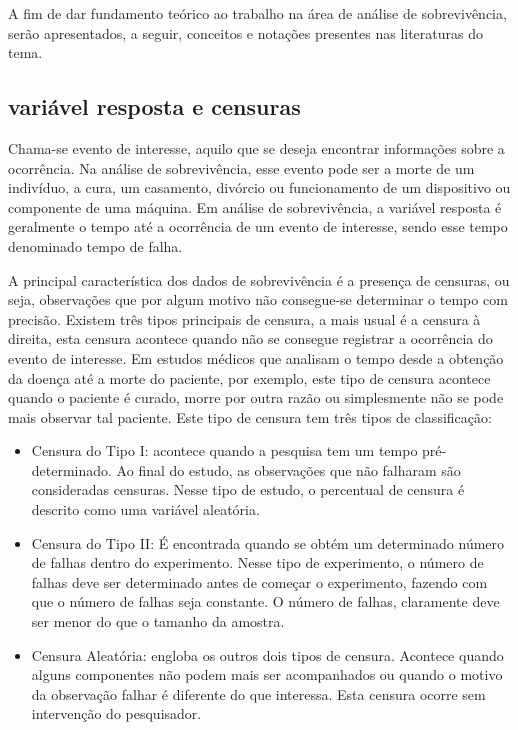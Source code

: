 \documentclass[a4paper,12pt]{article}
\begin{document}
A fim de dar fundamento teórico ao trabalho na área de análise de sobrevivência, serão apresentados, a seguir, conceitos e notações presentes nas literaturas do tema.

\subsection{variável resposta e censuras}
Chama-se evento de interesse, aquilo que se deseja encontrar informações sobre a ocorrência. Na análise de sobrevivência, esse evento pode ser a morte de um indivíduo, a cura, um casamento, divórcio ou funcionamento de um dispositivo ou componente de uma máquina. Em análise de sobrevivência, a variável resposta é geralmente o tempo até a ocorrência de um evento de interesse, sendo esse tempo denominado tempo de falha.%

A principal característica dos dados de sobrevivência é a presença de censuras, ou seja, observações que por algum motivo não consegue-se determinar o tempo com precisão. Existem três tipos principais de censura, a mais usual é a censura à direita, esta censura acontece quando não se consegue registrar a ocorrência do evento de interesse. Em estudos médicos que analisam o tempo desde a obtenção da doença até a morte do paciente, por exemplo, este tipo de censura acontece quando o paciente é curado, morre por outra razão ou simplesmente não se pode mais observar tal paciente. Este tipo de censura tem três tipos de classificação:

\begin{itemize}
	\item Censura do Tipo I: acontece quando a pesquisa tem um tempo pré-determinado. Ao final do estudo, as observações que não falharam são consideradas censuras. Nesse tipo de estudo, o percentual de censura é descrito como uma variável aleatória.
	
	\item Censura do Tipo II: É encontrada quando se obtém um determinado número de falhas dentro do experimento. Nesse tipo de experimento, o número de falhas deve ser determinado antes de começar o experimento, fazendo com que o número de falhas seja constante. O número de falhas, claramente deve ser menor do que o tamanho da amostra.
	
	\item Censura Aleatória: engloba os outros dois tipos de censura. Acontece quando alguns componentes não podem mais ser acompanhados ou quando o motivo da observação falhar é diferente do que interessa. Esta censura ocorre sem intervenção do pesquisador.

\end{itemize}
\end{document}
